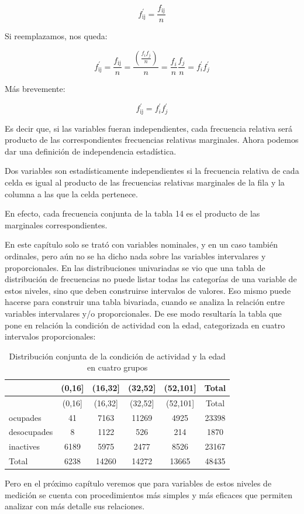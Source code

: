 \documentclass[]{book}
\begin{document}
\[f_{\text{ij}}^{'} = \frac{f_{\text{ij}}}{n}\]

Si reemplazamos, nos queda:

\[f_{\text{ij}}^{'} = \frac{f_{\text{ij}}}{n} = \frac{\left( \frac{f_{i}f_{j}}{n} \right)}{n} = \frac{f_{i}}{n}\frac{f_{j}}{n} = f_{i}^{'}f_{j}^{'}\]

Más brevemente:

\[f_{\text{ij}}^{'} = f_{i}^{'}f_{j}^{'}\]

Es decir que, si las variables fueran independientes, cada frecuencia
relativa será producto de las correspondientes frecuencias relativas
marginales. Ahora podemos dar una definición de independencia
estadística.

Dos variables son estadísticamente independientes si la frecuencia
relativa de cada celda es igual al producto de las frecuencias relativas marginales de la fila y la columna a las que la celda pertenece.

En efecto, cada frecuencia conjunta de la tabla 14 es el producto de las marginales correspondientes.

En este capítulo solo se trató con variables nominales, y en un caso también ordinales, pero aún no se ha dicho nada sobre las variables intervalares y proporcionales. En las distribuciones univariadas se vio que una tabla de distribución de frecuencias no puede listar todas las categorías de una variable de estos niveles, sino que deben construirse intervalos de valores. Eso mismo puede hacerse para construir una tabla bivariada, cuando se analiza la relación entre variables intervalares y/o proporcionales. De ese modo resultaría la tabla que pone en relación la condición de actividad con la edad, categorizada en cuatro intervalos proporcionales:

\begin{longtable}[]{@{}lccccc@{}}
\caption{\label{tab:unnamed-chunk-126}Distribución conjunta de la condición de actividad y la edad en cuatro grupos}\tabularnewline
\toprule
& (0,16{]} & (16,32{]} & (32,52{]} & (52,101{]} & Total\tabularnewline
\midrule
\endfirsthead
\toprule
& (0,16{]} & (16,32{]} & (32,52{]} & (52,101{]} & Total\tabularnewline
\midrule
\endhead
ocupades & 41 & 7163 & 11269 & 4925 & 23398\tabularnewline
desocupades & 8 & 1122 & 526 & 214 & 1870\tabularnewline
inactives & 6189 & 5975 & 2477 & 8526 & 23167\tabularnewline
Total & 6238 & 14260 & 14272 & 13665 & 48435\tabularnewline
\bottomrule
\end{longtable}

Pero en el próximo capítulo veremos que para variables de estos niveles de medición se cuenta con procedimientos más simples y más eficaces que permiten analizar con más detalle sus relaciones.
\end{document}
